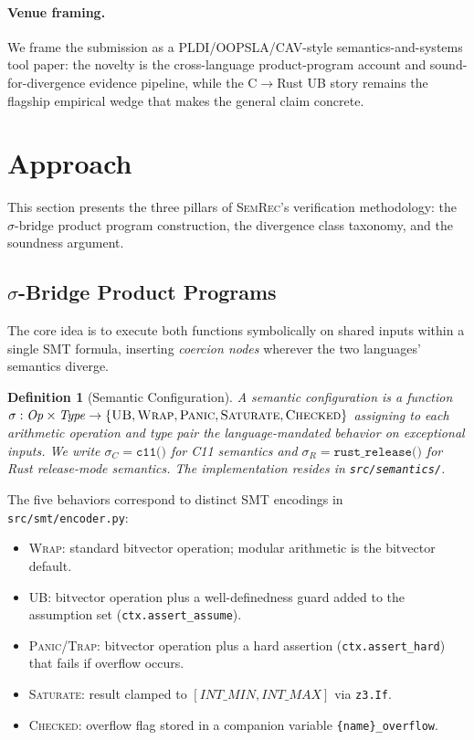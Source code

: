 \documentclass[10pt,a4paper]{article}
\newtheorem{definition}[theorem]{Definition}
\begin{document}
\paragraph{Venue framing.}
We frame the submission as a PLDI/OOPSLA/CAV-style semantics-and-systems tool
paper: the novelty is the cross-language product-program account and
sound-for-divergence evidence pipeline, while the C$\to$Rust UB story remains the
flagship empirical wedge that makes the general claim concrete.


\section{Approach}\label{sec:approach}

This section presents the three pillars of \textsc{SemRec}'s
verification methodology: the $\sigma$-bridge product program
construction, the divergence class taxonomy, and the soundness
argument.

\subsection{$\sigma$-Bridge Product Programs}\label{sec:sigma-bridge}

The core idea is to execute both functions symbolically on shared
inputs within a single SMT formula, inserting \emph{coercion nodes}
wherever the two languages' semantics diverge.

\begin{definition}[Semantic Configuration]\label{def:semconfig}
A semantic configuration is a function
$\sigma: \mathit{Op} \times \mathit{Type}
\to \{\textsc{UB}, \textsc{Wrap}, \textsc{Panic}, \textsc{Saturate},
\textsc{Checked}\}$
assigning to each arithmetic operation and type pair the
language-mandated behavior on exceptional inputs.  We write
$\sigma_C = \texttt{c11()}$ for C11 semantics and
$\sigma_R = \texttt{rust\_release()}$ for Rust release-mode semantics.
The implementation resides in \texttt{src/semantics/}.
\end{definition}

The five behaviors correspond to distinct SMT encodings in
\texttt{src/smt/encoder.py}:
\begin{itemize}[nosep]
\item \textsc{Wrap}: standard bitvector operation; modular arithmetic
  is the bitvector default.
\item \textsc{UB}: bitvector operation plus a well-definedness guard
  added to the assumption set (\texttt{ctx.assert\_assume}).
\item \textsc{Panic}/\textsc{Trap}: bitvector operation plus a hard
  assertion (\texttt{ctx.assert\_hard}) that fails if overflow occurs.
\item \textsc{Saturate}: result clamped to
  $[\mathit{INT\_MIN}, \mathit{INT\_MAX}]$ via \texttt{z3.If}.
\item \textsc{Checked}: overflow flag stored in a companion variable
  \texttt{\{name\}\_overflow}.
\end{itemize}
\end{document}
